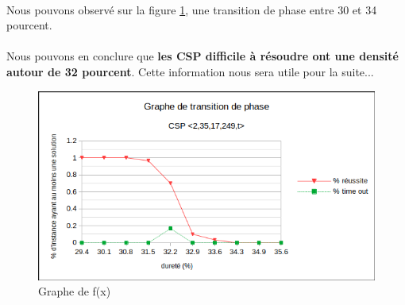 \documentclass[a4paper]{article}
\begin{document}
  \paragraph{}
    Nous pouvons observé sur la figure \ref{fig:graphTransi}, une transition de phase entre 30 et 34 pourcent.
  \paragraph{}
    Nous pouvons en conclure que \textbf{les CSP difficile à résoudre ont une densité autour de 32 pourcent}. Cette information nous sera utile pour la suite...
  \begin{figure}
				\centering
				\includegraphics[width=1.0\textwidth]{graphTransition.png}
				\caption{Graphe de f(x)}
				\label{fig:graphTransi}
	\end{figure}
\end{document}
